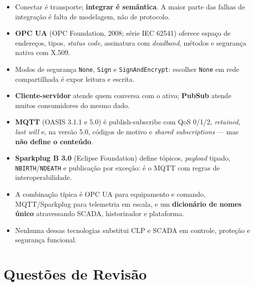 \begin{itemize}
\tightlist
\item
  Conectar é transporte; \textbf{integrar é semântica}. A maior parte das falhas de integração é falta de modelagem, não de protocolo.
\item
  \textbf{OPC UA} (OPC Foundation, 2008; série IEC 62541) oferece espaço de endereços, tipos, \emph{status code}, assinatura com \emph{deadband}, métodos e segurança nativa com X.509.
\item
  Modos de segurança \passthrough{\lstinline!None!}, \passthrough{\lstinline!Sign!} e \passthrough{\lstinline!SignAndEncrypt!}: escolher \passthrough{\lstinline!None!} em rede compartilhada é expor leitura e escrita.
\item
  \textbf{Cliente-servidor} atende quem conversa com o ativo; \textbf{PubSub} atende muitos consumidores do mesmo dado.
\item
  \textbf{MQTT} (OASIS 3.1.1 e 5.0) é publish-subscribe com QoS 0/1/2, \emph{retained}, \emph{last will} e, na versão 5.0, códigos de motivo e \emph{shared subscriptions} --- mas \textbf{não define o conteúdo}.
\item
  \textbf{Sparkplug B 3.0} (Eclipse Foundation) define tópicos, \emph{payload} tipado, \passthrough{\lstinline!NBIRTH!}/\passthrough{\lstinline!NDEATH!} e publicação por exceção: é o MQTT com regras de interoperabilidade.
\item
  A combinação típica é OPC UA para equipamento e comando, MQTT/Sparkplug para telemetria em escala, e um \textbf{dicionário de nomes único} atravessando SCADA, historizador e plataforma.
\item
  Nenhuma dessas tecnologias substitui CLP e SCADA em controle, proteção e segurança funcional.
\end{itemize}

\section{Questões de Revisão}\label{questuxf5es-de-revisuxe3o}

